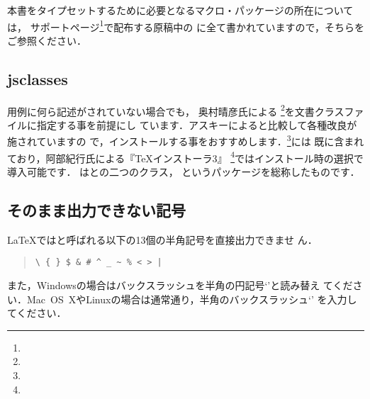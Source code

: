 本書をタイプセットするために必要となるマクロ・パッケージの所在については，
サポートページ\footnote{\webMyTeXpert}で配布する原稿中の
 に全て書かれていますので，そちらをご参照ください．
 

\subsection{jsclasses}
用例に何ら記述がされていない場合でも，
奥村晴彦氏による
\footnote{\webJsclasses}を文書クラスファイルに指定する事を前提にし
ています．アスキーによると比較して各種改良が施されていますの
で，インストールする事をおすすめします．\footnote{\webPtetex}には
既に含まれており，阿部紀行氏による『\TeX インストーラ3』
\footnote{\webTeXInstaller}ではインストール時の選択で導入可能です．
はとの二つのクラス，
というパッケージを総称したものです．



\subsection{そのまま出力できない記号}
{\LaTeX}ではと呼ばれる以下の13個の半角記号を直接出力できませ
ん．
\begin{quote}
 \verb+\ { } $ & # ^ _ ~ % < > |+
\end{quote}
また，Windowsの場合はバックスラッシュを半角の円記号`\textyen'と読み替え
てください．Mac~OS~XやLinuxの場合は通常通り，半角のバックスラッシュ`\BS'
を入力してください．

